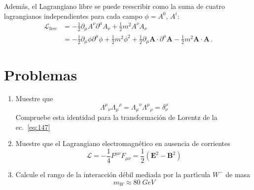 \begin{frame}
Además, el Lagrangiano libre se puede reescribir como la suma de cuatro lagrangianos independientes para cada campo $\phi=A^0$, $A^i$:
\begin{align}
  \mathcal{L}_{\text{free}}&=-\frac{1}{2}\partial_\mu A^\nu\partial^\mu A_\nu+\frac{1}{2} m^2A^\nu A_\nu\nonumber\\
  &=-\frac{1}{2}\partial_\mu \phi\partial^\mu \phi+\frac{1}{2} m^2\phi^2
   +\frac{1}{2}\partial_\mu \boldsymbol{A}\cdot \partial^\mu \boldsymbol{A}-\frac{1}{2} m^2\boldsymbol{A}\cdot \boldsymbol{A}\,.
\end{align}

\end{frame}








\section{Problemas}
\label{sec:problemas2}
\renewcommand{\labelenumi}{\thechapter.\theenumi} %

\begin{enumerate} %
\item Muestre que
  \begin{equation*}
    {\Lambda^{\mu}}_{\nu}{\Lambda_\mu}^{\rho}={\Lambda_{\mu}}^{\nu}{\Lambda^{\mu}}_{\rho}=\delta^\rho_\nu
  \end{equation*}
Compruebe esta identidad para la transformaci\'on de Lorentz de la ec.~\eqref{eq:147}
\label{item:pch2.1} %

\item Muestre que el Lagrangiano electromagn\'etico en ausencia de corrientes
  \begin{equation}
    \mathcal{L}=-\frac{1}{4}F^{\mu\nu}F_{\mu\nu}=\frac{1}{2}\left(\mathbf{E}^2-\mathbf{B}^2\right)
  \end{equation}
\label{item:pch2.2} %

\item Calcule el rango de la interacci\'on d\'ebil mediada por la part\'\i cula $W^{-}$ de masa
  \begin{equation}
    m_W\approx80\;GeV
  \end{equation}
\label{item:pch2.3} %
\end{enumerate} %
\renewcommand{\labelenumi}{\theenumi} %



